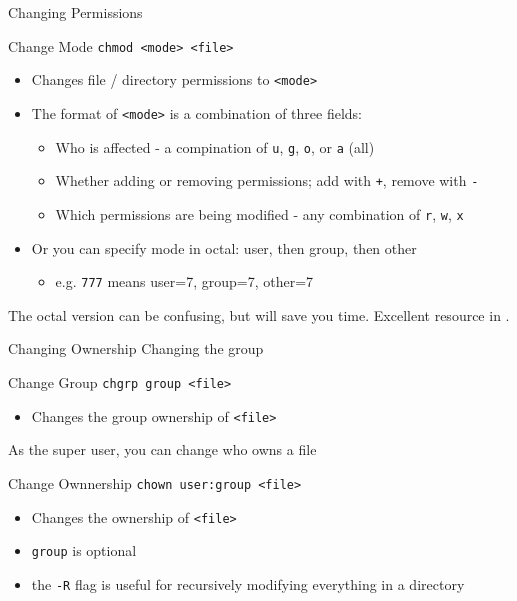 \documentclass[11pt]{beamer}
\newcommand{\colbf}[1]{\textcolor{mLightBrown!77!black}{#1}}%
\begin{document}
\begin{frame}[fragile]{Changing Permissions}
  \begin{block}{\colbf{Ch}ange \colbf{Mod}e}
    \texttt{chmod <mode> <file>}
    \begin{itemize}
      \item Changes file / directory permissions to \texttt{<mode>}
      \item The format of \texttt{<mode>} is a combination of three fields:
      \begin{itemize}
        \item Who is affected \-- a compination of \texttt{u}, \texttt{g}, \texttt{o}, or \texttt{a} (all)
        \item Whether adding or removing permissions; add with \texttt{+}, remove with \texttt{-}
        \item Which permissions are being modified \-- any combination of \texttt{r}, \texttt{w}, \texttt{x}
      \end{itemize}
      \item Or you can specify mode in octal: user, then group, then other
      \begin{itemize}
        \item e.g. \texttt{777} means user=7, group=7, other=7
      \end{itemize}
    \end{itemize}
  \end{block}
  The octal version can be confusing, but will save you time.  Excellent resource in \cite{chmod}.
\end{frame}

\begin{frame}[fragile]{Changing Ownership}
  Changing the group
  \begin{block}{\colbf{Ch}ange \colbf{Gr}ou\colbf{p}}
    \texttt{chgrp group <file>}
    \begin{itemize}
      \item Changes the group ownership of \texttt{<file>}
    \end{itemize}
  \end{block}

  As the super user, you can change who owns a file

  \begin{block}{\colbf{Ch}ange \colbf{Own}nership}
    \texttt{chown user:group <file>}
    \begin{itemize}
      \item Changes the ownership of \texttt{<file>}
      \item \texttt{group} is optional
      \item the \texttt{-R} flag is useful for recursively modifying everything in a directory
    \end{itemize}
  \end{block}
\end{frame}
\end{document}
